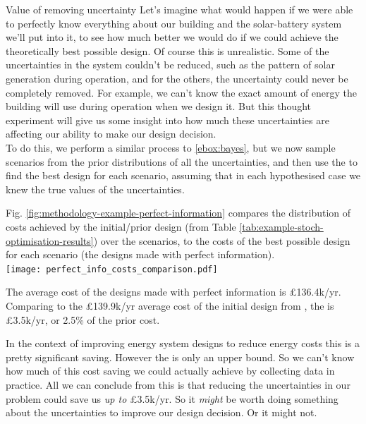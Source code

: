 \begin{ebox}[label=ebox:evpi]{Value of removing uncertainty}
    Let's imagine what would happen if we were able to perfectly know everything about our building and the solar-battery system we'll put into it, to see how much better we would do if we could achieve the theoretically best possible design. Of course this is unrealistic. Some of the uncertainties in the system couldn't be reduced, such as the pattern of solar generation during operation, and for the others, the uncertainty could never be completely removed. For example, we can't know the exact amount of energy the building will use during operation when we design it. But this thought experiment will give us some insight into how much these uncertainties are affecting our ability to make our design decision.\\

    To do this, we perform a similar process to \ref{ebox:bayes}, but we now sample scenarios from the prior distributions of all the uncertainties, and then use the  to find the best design for each scenario, assuming that in each hypothesised case we knew the true values of the uncertainties.

    Fig. \ref{fig:methodology-example-perfect-information} compares the distribution of costs achieved by the initial/prior design (from Table \ref{tab:example-stoch-optimisation-results}) over the scenarios, to the costs of the best possible design for each scenario (the designs made with perfect information).\\

    {
        \centering
        \texttt{[image: perfect\_info\_costs\_comparison.pdf]}
        \vspace*{-0.25cm}
        \label{fig:methodology-example-perfect-information}
    }
    \bigskip

    The average cost of the designs made with perfect information is £136.4k/yr. Comparing to the £139.9k/yr average cost of the initial design from , the  is £3.5k/yr, or 2.5\% of the prior cost.

    In the context of improving energy system designs to reduce energy costs this is a pretty significant saving. However the  is only an upper bound. So we can't know how much of this cost saving we could actually achieve by collecting data in practice. All we can conclude from this is that reducing the uncertainties in our problem could save us \textit{up to} £3.5k/yr. So it \textit{might} be worth doing something about the uncertainties to improve our design decision. Or it might not.
\end{ebox}
\vspace{-0.25cm}

